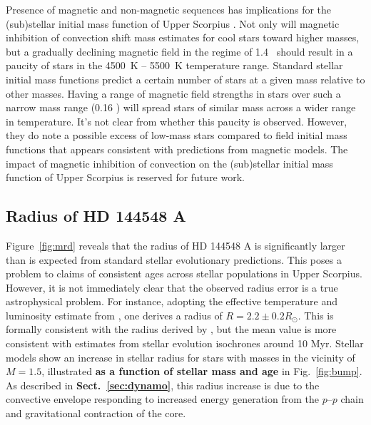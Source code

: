 \documentclass{aa}
\begin{document}
Presence of magnetic and non-magnetic sequences has implications for the (sub)stellar initial mass function of Upper Scorpius \citep{Ardila2000, Preibisch2002}. Not only will magnetic inhibition of convection shift mass estimates for cool stars toward higher masses, but a gradually declining magnetic field in the regime of 1.4 \msun\ should result in a paucity of stars in the 4500~K -- 5500~K temperature range. Standard stellar initial mass functions \citep[e.g.,][]{Salpeter1955, Kroupa2002} predict a certain number of stars at a given mass relative to other masses. Having a range of magnetic field strengths in stars over such a narrow mass range (0.16 \msun) will spread stars of similar mass across a wider range in temperature. It's not clear from \citet{Preibisch2002} whether this paucity is observed. However, they do note a possible excess of low-mass stars compared to field initial mass functions \citep{Scalo1998, Kroupa2002} that appears consistent with predictions from magnetic models. The impact of magnetic inhibition of convection on the (sub)stellar initial mass function of Upper Scorpius is reserved for future work.


\subsection{Radius of HD 144548 A}
\label{sec:radius}
Figure~\ref{fig:mrd} reveals that the radius of HD 144548 A is significantly larger than is expected from standard stellar evolutionary predictions. This poses a problem to claims of consistent ages across stellar populations in Upper Scorpius. However, it is not immediately clear that the observed radius error is a true astrophysical problem. For instance, adopting the effective temperature and luminosity estimate from \citet{Pecaut2012}, one derives a radius of $R = 2.2 \pm 0.2 R_{\odot}$. This is formally consistent with the radius derived by \citep{Alonso2015}, but the mean value is more consistent with estimates from stellar evolution isochrones around 10 Myr. Stellar models show an increase in stellar radius for stars with masses in the vicinity of $M = 1.5$\msun, illustrated {\bf as a function of stellar mass and age} in Fig.\ \ref{fig:bump}. As described in {\bf Sect.\ \ref{sec:dynamo}}, this radius increase is due to the convective envelope responding to increased energy generation from the $p$--$p$ chain and gravitational contraction of the core.
\end{document}
